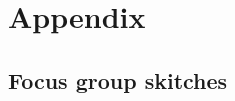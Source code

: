 
\chapter{Appendix} %

\label{AppendixA} %



%


\section {Focus group skitches}
\label{AppendixB} 
\setcounter{figure}{0}


